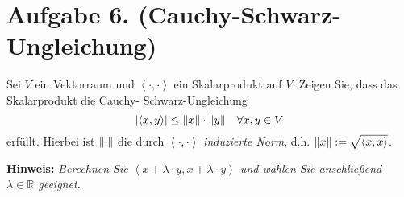 \documentclass[german,12pt]{homework}
\newcommand{\RR}{\mathbb{R}}
\newcommand{\dotproduct}[2]{\left\langle#1, #2\right\rangle}
\DeclarePairedDelimiter{\absolute}{\lvert}{\rvert}
\DeclarePairedDelimiter{\norm}{\lVert}{\rVert}
\begin{document}
    \section*{Aufgabe 6. (Cauchy-Schwarz-Ungleichung)}

    \begin{problem}
        Sei \(V\) ein Vektorraum und \(\dotproduct{\cdot}{\cdot}\) ein
        Skalarprodukt auf \(V\). Zeigen Sie, dass das Skalarprodukt die Cauchy-
        Schwarz-Ungleichung
        \[\absolute*{\dotproduct{x}{y}} \le \norm*{x} \cdot \norm*{y} \quad
        {\forall}x, y \in V\]
        erfüllt. Hierbei ist \(\norm*{\cdot}\) die durch
        \(\dotproduct{\cdot}{\cdot}\) \emph{induzierte Norm}, d.h. \(\norm*{x}
        := \sqrt{\dotproduct{x}{x}}\).

        \textbf{Hinweis:} \quad \emph{Berechnen Sie \(\dotproduct{x + \lambda
        \cdot y}{x + \lambda \cdot y}\) und wählen Sie anschließend \(\lambda
        \in \RR\) geeignet.}
    \end{problem}
\end{document}
